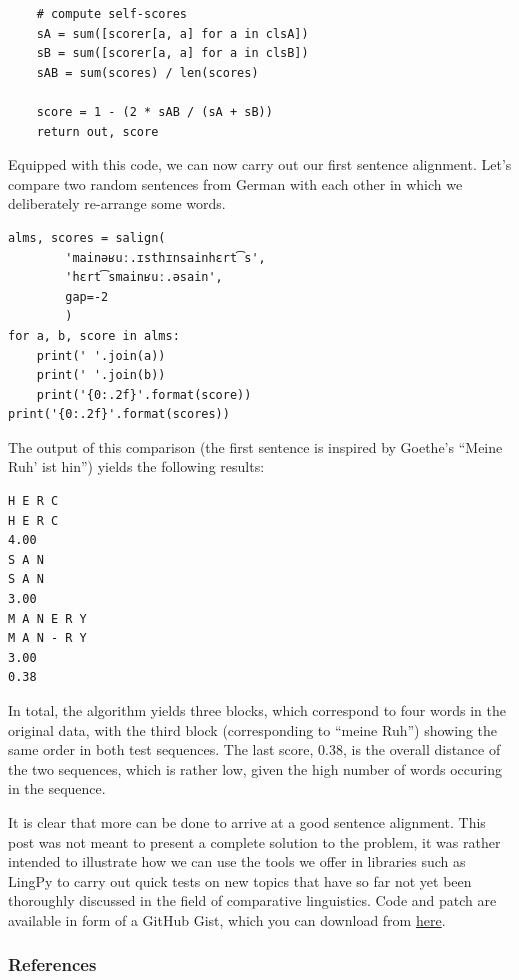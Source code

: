 \documentclass[
  a4paper,
  14pt,
  oneside,
  tablecaptionabove
]{scrbook}
\begin{document}
\begin{lstlisting}
    # compute self-scores
    sA = sum([scorer[a, a] for a in clsA])
    sB = sum([scorer[a, a] for a in clsB])
    sAB = sum(scores) / len(scores)

    score = 1 - (2 * sAB / (sA + sB))
    return out, score
\end{lstlisting}

Equipped with this code, we can now carry out our first sentence
alignment. Let's compare two random sentences from German with each
other in which we deliberately re-arrange some words.

\begin{lstlisting}
alms, scores = salign(
        'mainəʁuː.ɪsthɪnsainhɛrt͡s',
        'hɛrt͡smainʁuː.əsain',
        gap=-2
        )
for a, b, score in alms:
    print(' '.join(a))
    print(' '.join(b))
    print('{0:.2f}'.format(score))
print('{0:.2f}'.format(scores))
\end{lstlisting}

The output of this comparison (the first sentence is inspired by
Goethe's \enquote{Meine Ruh' ist hin}) yields the following results:

\begin{lstlisting}
H E R C
H E R C
4.00
S A N
S A N
3.00
M A N E R Y
M A N - R Y
3.00
0.38
\end{lstlisting}

In total, the algorithm yields three blocks, which correspond to four
words in the original data, with the third block (corresponding to
\enquote{meine Ruh}) showing the same order in both test sequences. The
last score, 0.38, is the overall distance of the two sequences, which is
rather low, given the high number of words occuring in the sequence.

It is clear that more can be done to arrive at a good sentence
alignment. This post was not meant to present a complete solution to the
problem, it was rather intended to illustrate how we can use the tools
we offer in libraries such as LingPy to carry out quick tests on new
topics that have so far not yet been thoroughly discussed in the field
of comparative linguistics. Code and patch are available in form of a
GitHub Gist, which you can download from
\href{https://gist.github.com/LinguList/8189f06f231909fbf1d1eed30998bd83}{here}.

\hypertarget{references-6}{%
\subsubsection*{References}\label{references-6}}
\end{document}
